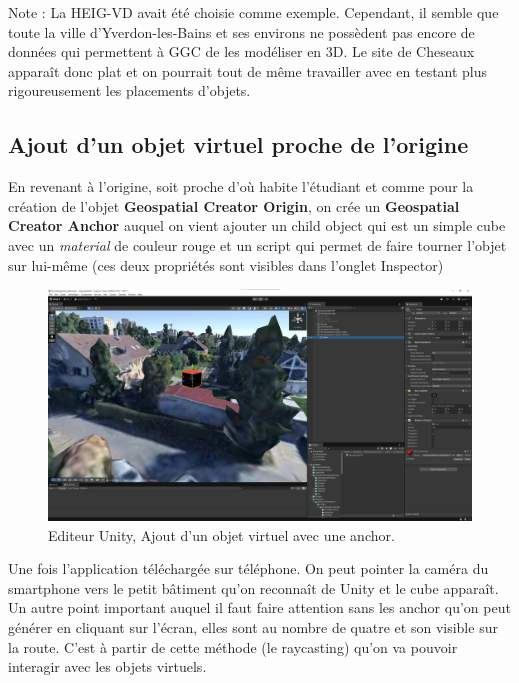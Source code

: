Note : La HEIG-VD avait été choisie comme exemple. Cependant, il semble que toute la ville d'Yverdon-les-Bains et ses environs ne possèdent pas encore
de données qui permettent à GGC de les modéliser en 3D. Le site de Cheseaux apparaît donc plat et on pourrait tout de même travailler avec
en testant plus rigoureusement les placements d'objets.

\subsection{Ajout d'un objet virtuel proche de l'origine}
En revenant à l'origine, soit proche d'où habite l'étudiant et comme pour la création de l'objet \textbf{Geospatial Creator Origin}, on crée un \textbf{Geospatial Creator Anchor} auquel on vient ajouter un child object
qui est un simple cube avec un \textit{material} de couleur rouge et un script  qui permet de faire tourner l'objet sur lui-même (ces deux propriétés sont visibles dans l'onglet Inspector)

\begin{figure}[H]
    \centering
    \includegraphics[width=1\linewidth]{assets/figures/Screenshots/GGC_3.png}
    \caption{Editeur Unity, Ajout d'un objet virtuel avec une anchor.}
    \label{fig:GGC_3}
\end{figure}
Une fois l'application téléchargée sur téléphone. On peut pointer la caméra du smartphone vers le petit bâtiment qu'on reconnaît de Unity et le cube apparaît.
Un autre point important auquel il faut faire attention sans les anchor qu'on peut générer en cliquant sur l'écran, elles sont au nombre de quatre et son visible sur la route. C'est à partir de cette méthode (le raycasting)
qu'on va pouvoir interagir avec les objets virtuels.

